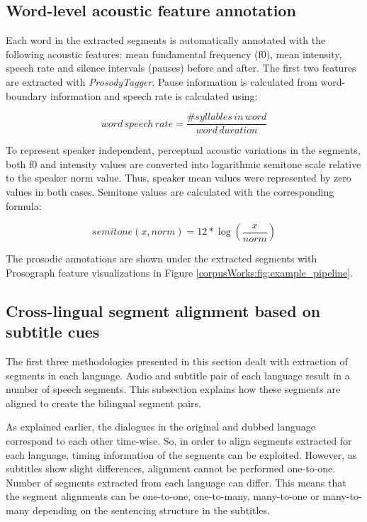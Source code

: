 \subsection*{Word-level acoustic feature annotation}

Each word in the extracted segments is automatically annotated with the following acoustic features: mean fundamental frequency (f0), mean intensity, speech rate and silence intervals (pauses) before and after. The first two features are extracted with \textit{ProsodyTagger}. Pause information is calculated from word-boundary information and speech rate is calculated using:

\begin{equation}
  word\,speech\,rate = {\dfrac{\#syllables\,in\,word}{word\,duration}}
  \label{sprate}
\end{equation}

To represent speaker independent, perceptual acoustic variations in the segments, both f0 and intensity values are converted into logarithmic semitone scale relative to the speaker norm value. Thus, speaker mean values were represented by zero values in both cases. Semitone values are calculated with the corresponding formula:

\begin{equation}
  semitone(x, norm) = 12 * \log (\dfrac{x}{norm})
  \label{semitone}
\end{equation}

The prosodic annotations are shown under the extracted segments with Prosograph feature visualizations in Figure \ref{corpusWorks:fig:example_pipeline}.

\subsection*{Cross-lingual segment alignment based on subtitle cues}
\label{subsec:alignment}
The first three methodologies presented in this section dealt with extraction of segments in each language. Audio and subtitle pair of each language result in a number of speech segments. This subsection explains how these segments are aligned to create the bilingual segment pairs. 

As explained earlier, the dialogues in the original and dubbed language correspond to each other time-wise. So, in order to align segments extracted for each language, timing information of the segments can be exploited. However, as subtitles show slight differences, alignment cannot be performed one-to-one. Number of segments extracted from each language can differ. This means that the segment alignments can be one-to-one, one-to-many, many-to-one or many-to-many depending on the sentencing structure in the subtitles. 

